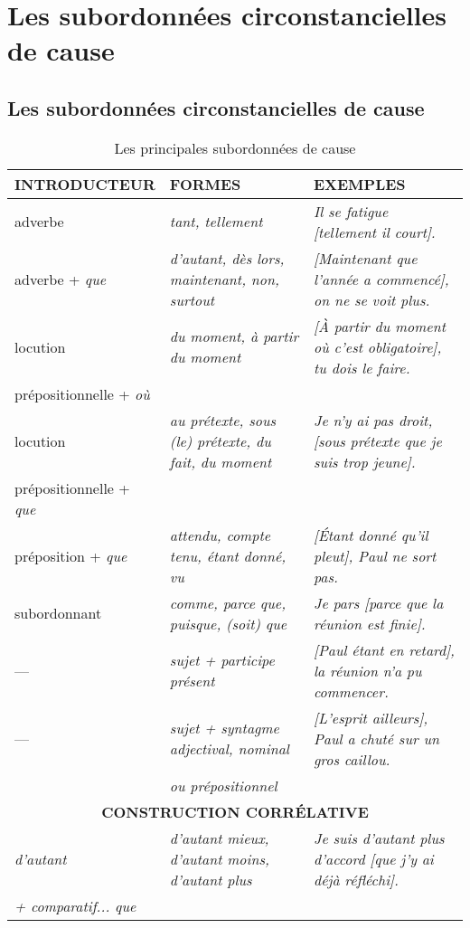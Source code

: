 \documentclass[UTF8]{report}
\begin{document}
\section{Les subordonnées circonstancielles de cause}

\subsection{Les subordonnées circonstancielles de cause}

\begin{table}[H]
    \centering
    \small
    
    \begin{adjustbox}{max width =\textwidth}
        \begin{tabular}{|l|l|l|}
        \hline
        \rowcolor{cyan!20}
        \textbf{INTRODUCTEUR} & \textbf{FORMES} & \textbf{EXEMPLES} \\
        \hline
        adverbe & \textit{tant, tellement} & \textit{Il se fatigue [tellement il court].} \\
        \hline
        adverbe + \textit{que} & \textit{d'autant, dès lors, maintenant, non, surtout} & \textit{[Maintenant que l'année a commencé], on ne se voit plus.} \\
        \hline
        locution & \textit{du moment, à partir du moment} & \textit{[À partir du moment où c'est obligatoire], tu dois le faire.} \\
        prépositionnelle + \textit{où} & & \\
        \hline
        locution & \textit{au prétexte, sous (le) prétexte, du fait, du moment} & \textit{Je n'y ai pas droit, [sous prétexte que je suis trop jeune].} \\
        prépositionnelle + \textit{que} & & \\
        \hline
        préposition + \textit{que} & \textit{attendu, compte tenu, étant donné, vu} & \textit{[Étant donné qu'il pleut], Paul ne sort pas.} \\
        \hline
        subordonnant & \textit{comme, parce que, puisque, (soit) que} & \textit{Je pars [parce que la réunion est finie].} \\
        \hline
        --- & \textit{sujet + participe présent} & \textit{[Paul étant en retard], la réunion n'a pu commencer.} \\
        \hline
        --- & \textit{sujet + syntagme adjectival, nominal} & \textit{[L'esprit ailleurs], Paul a chuté sur un gros caillou.} \\
        & \textit{ou prépositionnel} & \\
        \hline
        \multicolumn{3}{|c|}{\textbf{CONSTRUCTION CORRÉLATIVE}} \\
        \hline
        \textit{d'autant} & \textit{d'autant mieux, d'autant moins, d'autant plus} & \textit{Je suis d'autant plus d'accord [que j'y ai déjà réfléchi].} \\
        \textit{+ comparatif... que} & & \\
        \hline
        \end{tabular}
    \end{adjustbox}
    \caption{Les principales subordonnées de cause}
\end{table}
\end{document}

